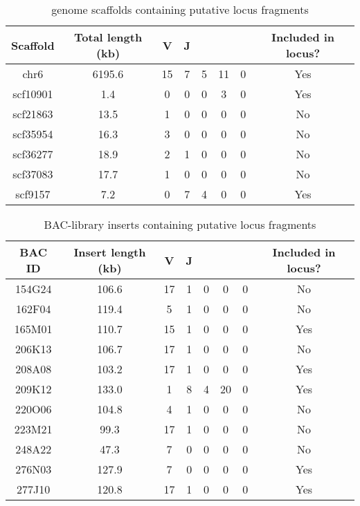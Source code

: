 \begin{table}[bh]
\centering
\caption{\Nfu genome scaffolds containing putative \igh{} locus fragments}
\begin{threeparttable}
\begin{tabular}{cccccccc}\toprule
\textbf{Scaffold} & \textbf{Total length (kb)} & \textbf{V} & \textbf{J} & \textbf{\cm{}} & \textbf{\cd{}} & \textbf{\cz{}} & \textbf{Included in locus?}\\\midrule
chr6 & 6195.6 & 15 & 7 & 5 & 11 & 0 & Yes\\\midrule
scf10901 & 1.4 & 0 & 0 & 0 & 3 & 0 & Yes\\
scf21863 & 13.5 & 1 & 0 & 0 & 0 & 0 & No\\
scf35954 & 16.3 & 3 & 0 & 0 & 0 & 0 & No\\
scf36277 & 18.9 & 2 & 1 & 0 & 0 & 0 & No\\
scf37083 & 17.7 & 1 & 0 & 0 & 0 & 0 & No\\
scf9157 & 7.2 & 0 & 7 & 4 & 0 & 0 & Yes\\\bottomrule
\end{tabular}
\end{threeparttable}
\label{tab:nfu-locus-scaffolds}
\end{table}

\begin{table}[bh]
\centering
\caption{\Nfu BAC-library inserts containing putative \igh{} locus fragments}
\begin{threeparttable}
\begin{tabular}{cccccccc}\toprule
\textbf{BAC ID} & \textbf{Insert length (kb)} & \textbf{V} & \textbf{J} & \textbf{\cm{}} & \textbf{\cd{}} & \textbf{\cz{}} & \textbf{Included in locus?}\\\midrule
154G24 & 106.6 & 17 & 1 & 0 & 0  & 0 & No\\
162F04 & 119.4 & 5  & 1 & 0 & 0  & 0 & No\\
165M01 & 110.7 & 15 & 1 & 0 & 0  & 0 & Yes\\
206K13 & 106.7 & 17 & 1 & 0 & 0  & 0 & No\\
208A08 & 103.2 & 17 & 1 & 0 & 0  & 0 & Yes\\
209K12 & 133.0 & 1  & 8 & 4 & 20 & 0 & Yes\\
220O06 & 104.8 & 4  & 1 & 0 & 0  & 0 & No\\
223M21 & 99.3  & 17 & 1 & 0 & 0  & 0 & No\\
248A22 & 47.3  & 7  & 0 & 0 & 0  & 0 & No\\
276N03 & 127.9 & 7  & 0 & 0 & 0  & 0 & Yes\\
277J10 & 120.8 & 17 & 1 & 0 & 0  & 0 & Yes\\
\bottomrule\end{tabular}
\end{threeparttable}
\label{tab:nfu-locus-bacs}
\end{table}

